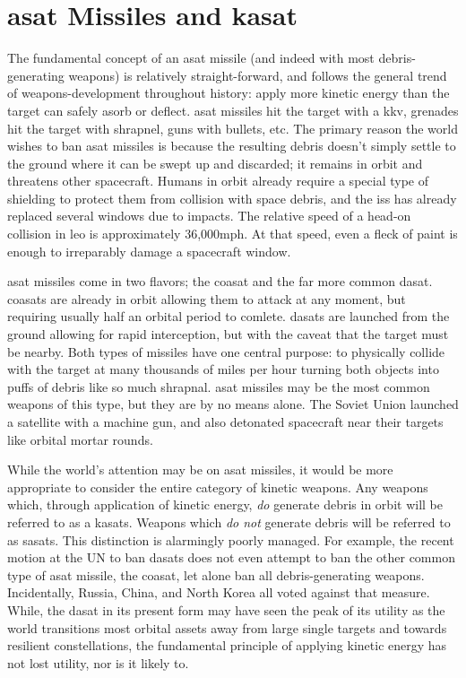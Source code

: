 \section*{\ac{asat} Missiles and \acf{kasat}}

The fundamental concept of an \ac{asat} missile (and indeed with most
debris-generating weapons) is relatively straight-forward, and follows
the general trend of weapons-development throughout history: apply
more kinetic energy than the target can safely asorb or deflect.
\ac{asat} missiles hit the target with a \ac{kkv}, grenades hit the
target with shrapnel, guns with bullets, etc.  The primary reason the
world wishes to ban \ac{asat} missiles is because the resulting debris
doesn't simply settle to the ground where it can be swept up and
discarded; it remains in orbit and threatens other spacecraft.  Humans
in orbit already require a special type of shielding to protect them
from collision with space debris, and the \ac{iss} has already
replaced several windows due to impacts.  The relative speed of a
head-on collision in \ac{leo} is approximately 36,000mph.  At that
speed, even a fleck of paint is enough to irreparably damage a
spacecraft window.

\ac{asat} missiles come in two flavors; the \acf{coasat} and the far
more common \acf{dasat}.  \acp{coasat} are already in orbit allowing
them to attack at any moment, but requiring usually half an orbital
period to comlete.  \acp{dasat} are launched from the ground allowing
for rapid interception, but with the caveat that the target must be
nearby.  Both types of missiles have one central purpose: to
physically collide with the target at many thousands of miles per hour
turning both objects into puffs of debris like so much shrapnal.
\ac{asat} missiles may be the most common weapons of this type, but
they are by no means alone.  The Soviet Union launched a satellite
with a machine gun, and also detonated spacecraft near their targets
like orbital mortar rounds.

While the world's attention may be on \ac{asat} missiles, it would be
more appropriate to consider the entire category of kinetic weapons.
Any weapons which, through application of kinetic energy, \emph{do}
generate debris in orbit will be referred to as a \acp{kasat}.
Weapons which \emph{do not} generate debris will be referred to as
\acp{sasat}.  This distinction is alarmingly poorly managed.  For
example, the recent motion at the UN to ban \acp{dasat} does not even
attempt to ban the other common type of \ac{asat} missile, the
\ac{coasat}, let alone ban all debris-generating weapons.
Incidentally, Russia, China, and North Korea all voted against that
measure.  While, the \ac{dasat} in its present form may have seen the
peak of its utility as the world transitions most orbital assets away
from large single targets and towards resilient constellations, the
fundamental principle of applying kinetic energy has not lost utility,
nor is it likely to.

